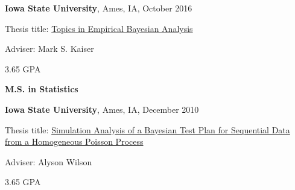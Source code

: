 \documentclass[11pt]{article}
\newenvironment{outerlist}[1][\enskip\textbullet]%
        {\begin{itemize}[#1]}{\end{itemize}%
         \vspace{-.6\baselineskip}}
\newenvironment{innerlist}[1][\enskip\textbullet]%
        {\begin{compactitem}[#1]}{\end{compactitem}}
\begin{document}
\begin{outerlist}

\item[] \textbf{Iowa State University}, Ames, IA, October 2016
             \begin{innerlist}
             	\item Thesis title: \href{https://lib.dr.iastate.edu/etd/15910/}{Topics in Empirical Bayesian Analysis}
		\item Adviser: Mark S. Kaiser
		\item 3.65 GPA
             \end{innerlist}

\end{outerlist}

\vspace{0.1in}

\textbf{M.S. in Statistics}
\begin{outerlist}
	\item[] \textbf{Iowa State University}, Ames, IA, December 2010	
	\begin{innerlist}
		\item Thesis title: \href{https://github.com/rcfoster/rcfoster.github.io/blob/master/Writing/MS\%20Thesis/MS\%20Thesis.pdf}{ Simulation Analysis of a Bayesian Test Plan for Sequential Data from a Homogeneous Poisson Process}
		\item Adviser: Alyson Wilson
		\item 3.65 GPA
         \end{innerlist}
\end{outerlist}
\end{document}
